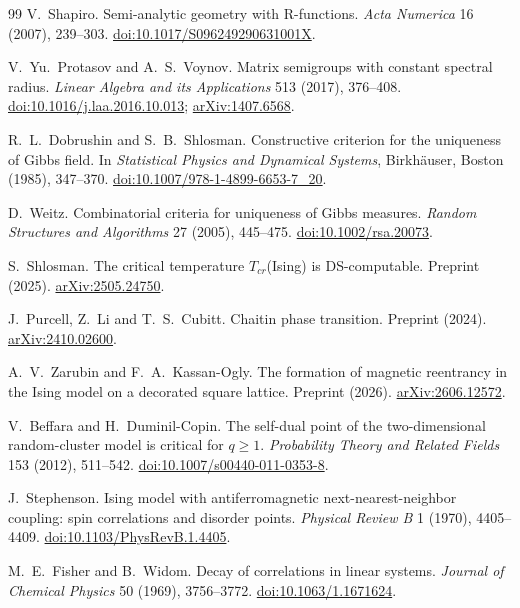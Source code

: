 \begin{thebibliography}{99}
 V.~Shapiro.
Semi-analytic geometry with R-functions.
\emph{Acta Numerica} 16 (2007), 239--303.
\href{https://doi.org/10.1017/S096249290631001X}{doi:10.1017/S096249290631001X}.

 V.~Yu.~Protasov and A.~S.~Voynov.
Matrix semigroups with constant spectral radius.
\emph{Linear Algebra and its Applications} 513 (2017), 376--408.
\href{https://doi.org/10.1016/j.laa.2016.10.013}{doi:10.1016/j.laa.2016.10.013};
\href{https://arxiv.org/abs/1407.6568}{arXiv:1407.6568}.

 R.~L.~Dobrushin and S.~B.~Shlosman.
Constructive criterion for the uniqueness of Gibbs field.
In \emph{Statistical Physics and Dynamical Systems}, Birkh\"auser, Boston (1985), 347--370.
\href{https://doi.org/10.1007/978-1-4899-6653-7_20}{doi:10.1007/978-1-4899-6653-7\_20}.

 D.~Weitz.
Combinatorial criteria for uniqueness of Gibbs measures.
\emph{Random Structures and Algorithms} 27 (2005), 445--475.
\href{https://doi.org/10.1002/rsa.20073}{doi:10.1002/rsa.20073}.

 S.~Shlosman.
The critical temperature \(T_{cr}\)(Ising) is DS-computable.
Preprint (2025). \href{https://arxiv.org/abs/2505.24750}{arXiv:2505.24750}.

 J.~Purcell, Z.~Li and T.~S.~Cubitt.
Chaitin phase transition.
Preprint (2024). \href{https://arxiv.org/abs/2410.02600}{arXiv:2410.02600}.

 A.~V.~Zarubin and F.~A.~Kassan-Ogly.
The formation of magnetic reentrancy in the Ising model on a decorated square lattice.
Preprint (2026). \href{https://arxiv.org/abs/2606.12572}{arXiv:2606.12572}.

 V.~Beffara and H.~Duminil-Copin.
The self-dual point of the two-dimensional random-cluster model is critical for \(q\ge1\).
\emph{Probability Theory and Related Fields} 153 (2012), 511--542.
\href{https://doi.org/10.1007/s00440-011-0353-8}{doi:10.1007/s00440-011-0353-8}.

 J.~Stephenson.
Ising model with antiferromagnetic next-nearest-neighbor coupling: spin correlations and disorder points.
\emph{Physical Review B} 1 (1970), 4405--4409.
\href{https://doi.org/10.1103/PhysRevB.1.4405}{doi:10.1103/PhysRevB.1.4405}.

 M.~E.~Fisher and B.~Widom.
Decay of correlations in linear systems.
\emph{Journal of Chemical Physics} 50 (1969), 3756--3772.
\href{https://doi.org/10.1063/1.1671624}{doi:10.1063/1.1671624}.


\end{thebibliography}
